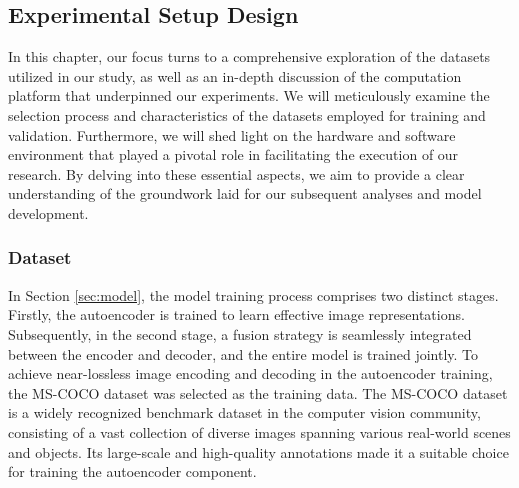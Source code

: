 \subsection{Experimental Setup Design} \label{sec:setup}
In this chapter, our focus turns to a comprehensive exploration of the datasets utilized in our study, as well as an in-depth discussion of the computation platform that underpinned our experiments. We will meticulously examine the selection process and characteristics of the datasets employed for training and validation. Furthermore, we will shed light on the hardware and software environment that played a pivotal role in facilitating the execution of our research. By delving into these essential aspects, we aim to provide a clear understanding of the groundwork laid for our subsequent analyses and model development.

\subsubsection{Dataset} \label{subsec:dataset}
In Section \ref{sec:model}, the model training process comprises two distinct stages. Firstly, the autoencoder is trained to learn effective image representations. Subsequently, in the second stage, a fusion strategy is seamlessly integrated between the encoder and decoder, and the entire model is trained jointly. To achieve near-lossless image encoding and decoding in the autoencoder training, the MS-COCO \cite{lin2014microsoft} dataset was selected as the training data. The MS-COCO dataset is a widely recognized benchmark dataset in the computer vision community, consisting of a vast collection of diverse images spanning various real-world scenes and objects. Its large-scale and high-quality annotations made it a suitable choice for training the autoencoder component.

